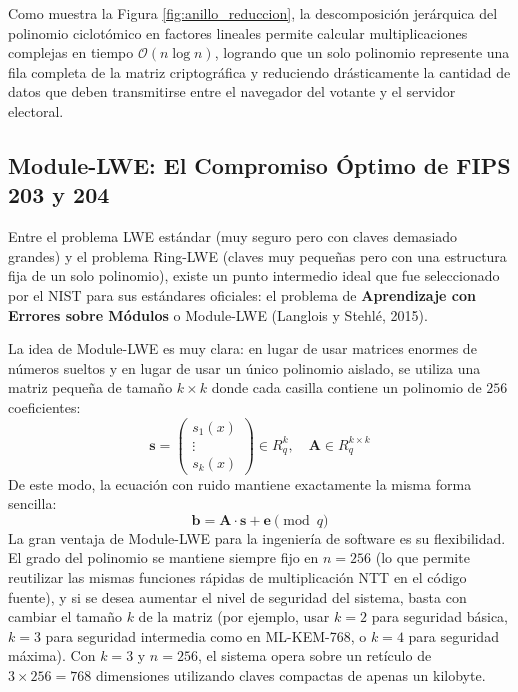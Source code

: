 Como muestra la Figura \ref{fig:anillo_reduccion}, la descomposición jerárquica del polinomio ciclotómico en factores lineales permite calcular multiplicaciones complejas en tiempo $\mathcal{O}(n \log n)$, logrando que un solo polinomio represente una fila completa de la matriz criptográfica y reduciendo drásticamente la cantidad de datos que deben transmitirse entre el navegador del votante y el servidor electoral.

\subsection{Module-LWE: El Compromiso Óptimo de FIPS 203 y 204}

Entre el problema LWE estándar (muy seguro pero con claves demasiado grandes) y el problema Ring-LWE (claves muy pequeñas pero con una estructura fija de un solo polinomio), existe un punto intermedio ideal que fue seleccionado por el NIST para sus estándares oficiales: el problema de \textbf{Aprendizaje con Errores sobre Módulos} o Module-LWE (Langlois y Stehlé, 2015).

La idea de Module-LWE es muy clara: en lugar de usar matrices enormes de números sueltos y en lugar de usar un único polinomio aislado, se utiliza una matriz pequeña de tamaño $k \times k$ donde cada casilla contiene un polinomio de $256$ coeficientes:
\begin{equation}
	\mathbf{s} = \begin{pmatrix} s_1(x) \\ \vdots \\ s_k(x) \end{pmatrix} \in R_q^k, \quad \mathbf{A} \in R_q^{k \times k}
\end{equation}
De este modo, la ecuación con ruido mantiene exactamente la misma forma sencilla:
\begin{equation}
	\mathbf{b} = \mathbf{A} \cdot \mathbf{s} + \mathbf{e} \pmod q
\end{equation}
La gran ventaja de Module-LWE para la ingeniería de software es su flexibilidad. El grado del polinomio se mantiene siempre fijo en $n = 256$ (lo que permite reutilizar las mismas funciones rápidas de multiplicación NTT en el código fuente), y si se desea aumentar el nivel de seguridad del sistema, basta con cambiar el tamaño $k$ de la matriz (por ejemplo, usar $k = 2$ para seguridad básica, $k = 3$ para seguridad intermedia como en ML-KEM-768, o $k = 4$ para seguridad máxima). Con $k = 3$ y $n = 256$, el sistema opera sobre un retículo de $3 \times 256 = 768$ dimensiones utilizando claves compactas de apenas un kilobyte.


